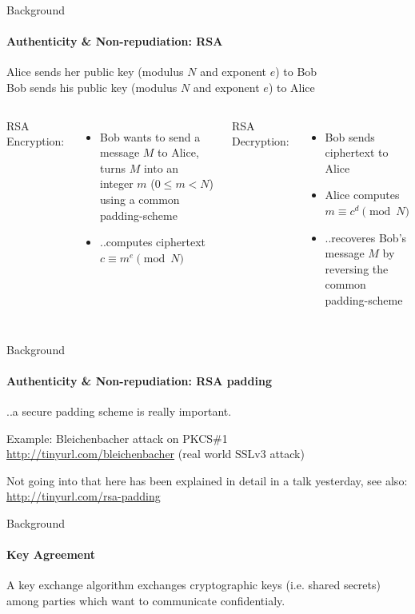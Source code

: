 \documentclass[hyperref={draft}]{beamer}
\begin{document}
\begin{frame}{Background}
  \framesubtitle{Authenticity \& Non-repudiation: RSA}
  Alice sends her public key (modulus $N$ and exponent $e$) to Bob\\
  Bob sends his public key (modulus $N$ and exponent $e$) to Alice
  \vspace{10px}
  \begin{columns}[T]
    RSA Encryption:
    \begin{itemize}
      \item Bob wants to send a message $M$ to Alice, turns $M$ into an integer $m$ ($0 \leq m < N$) using a common padding-scheme
      \item ..computes ciphertext\\ $c \equiv m^e \pmod N$
    \end{itemize}
    RSA Decryption:
    \begin{itemize}
      \item Bob sends ciphertext to Alice
      \item Alice computes\\$m \equiv c^d \pmod N$
      \item ..recoveres Bob's message $M$ by reversing the common padding-scheme
    \end{itemize}
  \end{columns}
\end{frame}

\begin{frame}{Background}
  \framesubtitle{Authenticity \& Non-repudiation: RSA padding}
  ..a secure padding scheme is really important.

  \vspace{20px}
 
  Example: Bleichenbacher attack on PKCS\#1\\
  \url{http://tinyurl.com/bleichenbacher} (real world SSLv3 attack)
  
  \vspace{20px}

  Not going into that here has been explained in detail in a talk yesterday, see also: \url{http://tinyurl.com/rsa-padding}
\end{frame}

\begin{frame}{Background}
  \framesubtitle{Key Agreement}
  A key exchange algorithm exchanges cryptographic keys (i.e. shared secrets) among parties which want to communicate confidentialy.
\end{frame}
\end{document}
